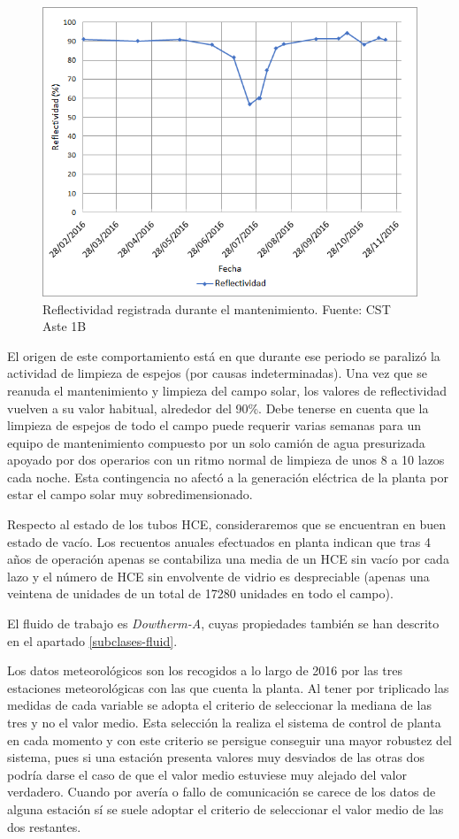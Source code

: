 \begin{figure}[H]
\includegraphics[width=0.9\linewidth]{images/reflectividad.png}
\caption[Reflectividad registrada durante el mantenimiento]{Reflectividad registrada durante el mantenimiento. Fuente: CST Aste 1B} 
\label{fig:reflectividad}
\end{figure}

El origen de este comportamiento está en que durante ese periodo se paralizó la actividad de limpieza de espejos (por causas indeterminadas). Una vez que se reanuda el mantenimiento y limpieza del campo solar, los valores de reflectividad vuelven a su valor habitual, alrededor del 90\%. Debe tenerse en cuenta que la limpieza de espejos de todo el campo puede requerir varias semanas para un equipo de mantenimiento compuesto por un solo camión de agua presurizada apoyado por dos operarios con un ritmo normal de limpieza de unos 8 a 10 lazos cada noche. Esta contingencia no afectó a la generación eléctrica de la planta por estar el campo solar muy sobredimensionado.

Respecto al estado de los tubos HCE, consideraremos que se encuentran en buen estado de vacío. Los recuentos anuales efectuados en planta indican que tras 4 años de operación apenas se contabiliza una media de un HCE sin vacío por cada lazo y el número de HCE sin envolvente de vidrio es despreciable (apenas una veintena de unidades de un total de 17280 unidades en todo el campo).

El fluido de trabajo es \emph{Dowtherm-A}, cuyas propiedades también se han descrito en el apartado \ref{subclases-fluid}.

Los datos meteorológicos son los recogidos a lo largo de 2016 por las tres estaciones meteorológicas con las que cuenta la planta. Al tener por triplicado las medidas de cada variable se adopta el criterio de seleccionar la mediana de las tres y no el valor medio. Esta selección la realiza el sistema de control de planta en cada momento y con este criterio se persigue conseguir una mayor robustez del sistema, pues si una estación presenta valores muy desviados de las otras dos podría darse el caso de que el valor medio estuviese muy alejado del valor  verdadero. Cuando por avería o fallo de comunicación se carece de los datos de alguna estación sí se suele adoptar el criterio de seleccionar el valor medio de las dos restantes.

